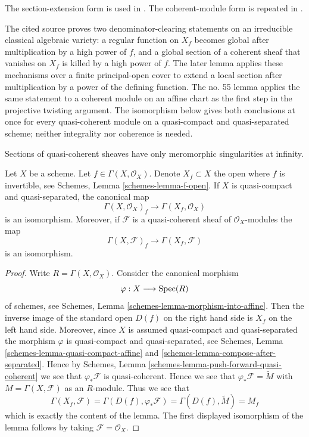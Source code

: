 \begin{lemma}
\label{lemma-invert-f-sections}
\begin{reference}
\cite[Chapter II, \S 3, no. 43, Propositions 5 and 6,
pp. 235--236]{FAC}
The section-extension form is used in
\cite[Chapter II, \S 3, no. 45, Lemma 1, pp. 237--238]{FAC}.
The coherent-module form is repeated in
\cite[Chapter III, \S 2, no. 55, Lemma 1, p. 247]{FAC}.
\end{reference}
\begin{history}
The cited source proves two denominator-clearing statements on an
irreducible classical algebraic variety: a regular function on $X_f$ becomes
global after multiplication by a high power of $f$, and a global section of
a coherent sheaf that vanishes on $X_f$ is killed by a high power of $f$.
The later lemma applies these mechanisms over a finite principal-open cover
to extend a local section after multiplication by a power of the defining
function. The no. 55 lemma applies the same statement to a coherent module
on an affine chart as the first step in the projective twisting argument.
The isomorphism below gives both conclusions at once for every quasi-coherent
module on a quasi-compact and quasi-separated scheme; neither integrality nor
coherence is needed.
\end{history}
\begin{slogan}
Sections of quasi-coherent sheaves have only meromorphic singularities
at infinity.
\end{slogan}
Let $X$ be a scheme. Let $f \in \Gamma(X, \mathcal{O}_X)$.
Denote $X_f \subset X$ the open where $f$ is invertible, see
Schemes, Lemma \ref{schemes-lemma-f-open}.
If $X$ is quasi-compact and quasi-separated, the canonical map
$$
\Gamma(X, \mathcal{O}_X)_f \longrightarrow \Gamma(X_f, \mathcal{O}_X)
$$
is an isomorphism. Moreover, if $\mathcal{F}$ is a quasi-coherent
sheaf of $\mathcal{O}_X$-modules the map
$$
\Gamma(X, \mathcal{F})_f \longrightarrow \Gamma(X_f, \mathcal{F})
$$
is an isomorphism.
\end{lemma}

\begin{proof}
Write $R = \Gamma(X, \mathcal{O}_X)$. Consider the canonical morphism
$$
\varphi : X \longrightarrow \mathop{\mathrm{Spec}}(R)
$$
of schemes, see
Schemes, Lemma
\ref{schemes-lemma-morphism-into-affine}.
Then the inverse image of the standard open $D(f)$ on the
right hand side is $X_f$ on the left hand side.
Moreover, since $X$ is assumed quasi-compact and quasi-separated
the morphism $\varphi$ is quasi-compact and quasi-separated,
see Schemes, Lemma \ref{schemes-lemma-quasi-compact-affine} and
\ref{schemes-lemma-compose-after-separated}. Hence by
Schemes, Lemma \ref{schemes-lemma-push-forward-quasi-coherent}
we see that $\varphi_*\mathcal{F}$ is quasi-coherent.
Hence we see that $\varphi_*\mathcal{F} = \widetilde M$
with $M = \Gamma(X, \mathcal{F})$ as an $R$-module.
Thus we see that
$$
\Gamma(X_f, \mathcal{F}) =
\Gamma(D(f), \varphi_*\mathcal{F}) =
\Gamma(D(f), \widetilde M) = M_f
$$
which is exactly the content of the lemma. The first displayed isomorphism
of the lemma follows by taking $\mathcal{F} = \mathcal{O}_X$.
\end{proof}

